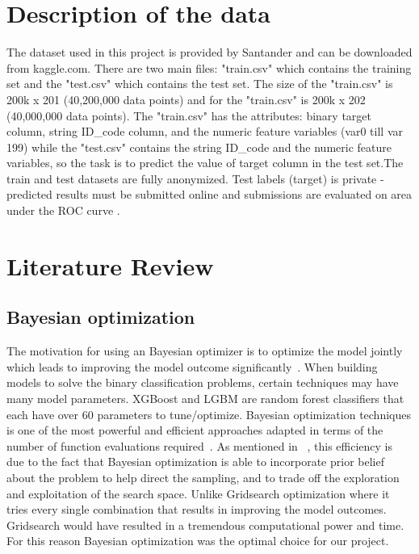 \documentclass[journal,twoside,web]{ieeecolor}
\begin{document}

\section{Description of the data}
The dataset used in this project is provided by Santander and can be downloaded from kaggle.com. There are two main files: "train.csv" which contains the training set and the "test.csv" which contains the test set. The size of the "train.csv" is 200k x 201 (40,200,000 data points) and for the "train.csv" is 200k x 202 (40,000,000 data points). The "train.csv" has the attributes: binary target column, string ID\_code column, and the numeric feature variables (var0 till var 199) while the "test.csv" contains the string ID\_code and the numeric feature variables, so the task is to predict the value of target column in the test set.The train and test datasets are fully anonymized. Test labels (target) is private - predicted results must be submitted online and submissions are evaluated on area under the ROC curve .






\section{Literature Review}

\subsection{Bayesian optimization}
The motivation for using an Bayesian optimizer is to optimize the model jointly which leads to improving the model outcome significantly~\cite{shahriari2016taking}. When building models to solve the binary classification problems, certain techniques may have many model parameters. XGBoost and LGBM are random forest classifiers that each have over 60 parameters to tune/optimize. Bayesian optimization techniques is one of the most powerful and efficient approaches adapted in terms of the number of function evaluations required~\cite{brochu2010tutorial}. As mentioned in ~\cite{brochu2010tutorial}, this efficiency is due to the fact that Bayesian optimization is able to incorporate prior belief about the problem to help direct the sampling, and to trade off the exploration and exploitation of the search space. Unlike Gridsearch optimization where it tries every single combination that results in improving the model outcomes. Gridsearch would have resulted in a tremendous computational power and time. For this reason Bayesian optimization was the optimal choice for our project. 
\end{document}
